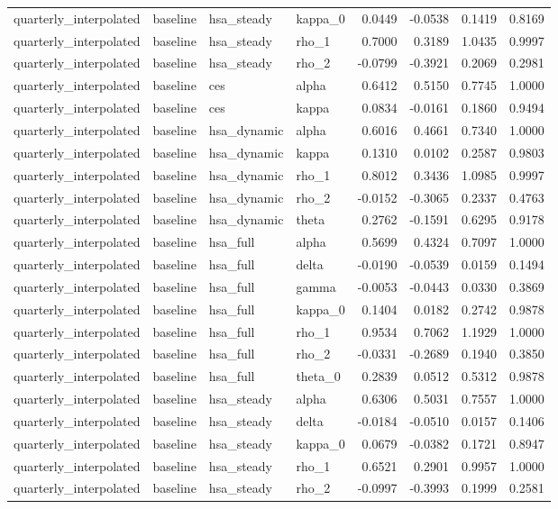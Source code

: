 \begin{tabular}{llllrrrr}
quarterly\_interpolated & baseline & hsa\_steady & kappa\_0 & 0.0449 & -0.0538 & 0.1419 & 0.8169 \\
quarterly\_interpolated & baseline & hsa\_steady & rho\_1 & 0.7000 & 0.3189 & 1.0435 & 0.9997 \\
quarterly\_interpolated & baseline & hsa\_steady & rho\_2 & -0.0799 & -0.3921 & 0.2069 & 0.2981 \\
quarterly\_interpolated & baseline & ces & alpha & 0.6412 & 0.5150 & 0.7745 & 1.0000 \\
quarterly\_interpolated & baseline & ces & kappa & 0.0834 & -0.0161 & 0.1860 & 0.9494 \\
quarterly\_interpolated & baseline & hsa\_dynamic & alpha & 0.6016 & 0.4661 & 0.7340 & 1.0000 \\
quarterly\_interpolated & baseline & hsa\_dynamic & kappa & 0.1310 & 0.0102 & 0.2587 & 0.9803 \\
quarterly\_interpolated & baseline & hsa\_dynamic & rho\_1 & 0.8012 & 0.3436 & 1.0985 & 0.9997 \\
quarterly\_interpolated & baseline & hsa\_dynamic & rho\_2 & -0.0152 & -0.3065 & 0.2337 & 0.4763 \\
quarterly\_interpolated & baseline & hsa\_dynamic & theta & 0.2762 & -0.1591 & 0.6295 & 0.9178 \\
quarterly\_interpolated & baseline & hsa\_full & alpha & 0.5699 & 0.4324 & 0.7097 & 1.0000 \\
quarterly\_interpolated & baseline & hsa\_full & delta & -0.0190 & -0.0539 & 0.0159 & 0.1494 \\
quarterly\_interpolated & baseline & hsa\_full & gamma & -0.0053 & -0.0443 & 0.0330 & 0.3869 \\
quarterly\_interpolated & baseline & hsa\_full & kappa\_0 & 0.1404 & 0.0182 & 0.2742 & 0.9878 \\
quarterly\_interpolated & baseline & hsa\_full & rho\_1 & 0.9534 & 0.7062 & 1.1929 & 1.0000 \\
quarterly\_interpolated & baseline & hsa\_full & rho\_2 & -0.0331 & -0.2689 & 0.1940 & 0.3850 \\
quarterly\_interpolated & baseline & hsa\_full & theta\_0 & 0.2839 & 0.0512 & 0.5312 & 0.9878 \\
quarterly\_interpolated & baseline & hsa\_steady & alpha & 0.6306 & 0.5031 & 0.7557 & 1.0000 \\
quarterly\_interpolated & baseline & hsa\_steady & delta & -0.0184 & -0.0510 & 0.0157 & 0.1406 \\
quarterly\_interpolated & baseline & hsa\_steady & kappa\_0 & 0.0679 & -0.0382 & 0.1721 & 0.8947 \\
quarterly\_interpolated & baseline & hsa\_steady & rho\_1 & 0.6521 & 0.2901 & 0.9957 & 1.0000 \\
quarterly\_interpolated & baseline & hsa\_steady & rho\_2 & -0.0997 & -0.3993 & 0.1999 & 0.2581 \\
\bottomrule
\end{tabular}

